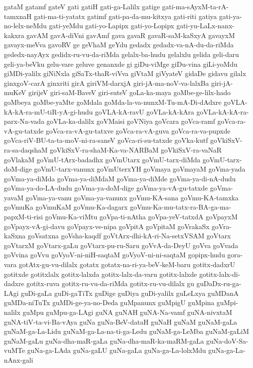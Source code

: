 {gataM
gatamf
gateV
gati
gatiH
gati-ga-Lalilx
gatige
gati-ma-sAyxM-ta-rA-tamxnaH
gati-ma-ti-yatatx
gatimf
gati-pa-da-mu-kitxya
gati-riti
gatiya
gati-ya-no-lelx-neMdu
gati-yeMdu
gati-yo-Lapipx
gati-yo-Lopipx
gati-yu-LaLx-nanx-kakxra
gavAM
gavA-diVni
gavAmf
gava
gavaR
gavaR-saM-kaSxyA
gavayxM
gavayx-meVva
gavoRV
ge
geVhaM
geYdu
gedadx
gedadx-va-nA-du-da-riMda
gededx-nayAyx
gedidx-ru-vu-da-riMda
gelalx-ba-hudu
gelalxlu
gelida
geli-daru
geli-ya-beVku
gelu-vare
geluve
genanxde
gi
giDu-viMge
giDu-vina
giLi-yoMdu
giMDi-yalilx
giNiNxla
giSaTx-thaR-viVva
giVtaM
giVyateV
gidaDe
gidavu
gilalx
ginxgoV-carA
ginxriti
girA
giriVM-darxjA
giri-jA-ma-noV-va-lalxBa
giri-jA-muKeV
girijeV
giri-saM-BaveV
giri-suteV
goLa-ka-maya
goMbe-ge-lilx-hado
goMbeya
goMbe-yaMte
goMdala
goMda-la-va-nunxM-Tu-mA-Di-dAdxre
goVLA-kA-kA-ra-mU-tiR-yA-gi-hudu
goVLA-kA-ravU
goVLa-kA-kAra
goVLa-kA-kA-ra-parx-Na-vada
goVLa-ka-dalilx
goVMaisi
goVNiya
goVcara
goVca-ramf
goVca-ra-vA-gu-tatxde
goVca-ra-vA-gu-tatxve
goVca-ra-vA-guva
goVca-ra-va-pupxde
goVca-riV-BU-ta-ta-moV-ni-ra-saneV
goVca-ri-su-tatxde
goVka-kutf
goVkiSxV-ra-sa-daqshaM
goVkiSxV-ra-shaM-Ka-va-NARBaM
goVkiSxV-ra-vaNaR
goVlakaM
goVmU-tArx-badadhx
goVmUtarx
goVmU-tarx-diMda
goVmU-tarx-doM-dige
goVmU-tarx-vanunx
goVmUterxYH
goVmaya
goVmayaM
goVma-yada
goVma-ya-diMda
goVma-ya-diMdaM
goVma-ya-diMde
goVma-ya-di-nA-dudu
goVma-ya-do-LA-dudu
goVma-ya-doM-dige
goVma-ya-vA-gu-tatxde
goVma-yavaM
goVma-ya-vanu
goVma-ya-vanunx
goVmu-KA-sana
goVmu-KA-tamxka
goVmuKa
goVmuKaM
goVmu-Ka-dagarx
goVmu-Ka-mu-tatx-ra-BA-ga-ma-papxM-ti-risi
goVmu-Ka-viMtu
goVpa-ti-nAtha
goVpa-yeV-tatxdA
goVpayxM
goVpayx-vA-gi-davu
goVpayx-ve-nipa
goVpitA
goVpitaM
goVrakaSx
goVra-kaSxna
goVsatxna
goVsha-kaqdf
goVtArx-dhi-kA-ri-Na-setxVSAM
goVtarx
goVtarxM
goVtarx-gaLu
goVtarx-pu-ru-Saru
goVvA-da-DeyU
goVva
goVvada
goVvina
goVvu
goVyoV-ni-niH-saqtaM
goVyoV-ni-ni-saqtaM
gopipx-hudu
gora-vara
gotAtx-gu-vu-dilalx
gotatx
gotatx-na-ri-ya-beV-keM-baru
gotitx-dadxrU
gotitxde
gotitxlalx
gotitx-lalxda
gotitx-lalx-da-varu
gotitx-lalxde
gotitx-lalx-di-dadxre
gotitx-ruva
gotitx-ru-vu-da-riMda
gotitx-ru-vu-dilalx
gu
guDaDx-ru-ga-LAgi
guDi-gaLa
guDi-gaTiTx
guDige
guDiya
guDi-yalilx
guLeLxya
guMDanA
guMDa-niTuTx
guMDi-ge-ya-no-Deda
guMpanunx
guMpigU
guMpina
guMpi-nalilx
guMpu
guMpu-ga-LAgi
guNA
guNAH
guNA-Na-vamf
guNA-nivxtaM
guNA-tiV-ta-vi-Ba-vAya
guNa
guNa-BeV-dataH
guNaH
guNaM
guNaM-gaLa
guNaM-ga-La-Lidu
guNaM-ga-La-na-ti-ga-Ledu
guNaM-ga-LeMba
guNaM-gaLiM
guNaM-gaLu
guNa-dha-maR-gaLa
guNa-dha-maR-ka-maRM-gaLa
guNa-doV-Sa-vuMTe
guNa-ga-LAda
guNa-gaLU
guNa-gaLa
guNa-ga-La-lolxMdu
guNa-ga-La-nAnx-gali
}
